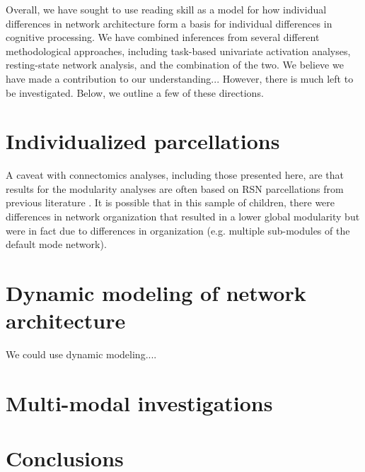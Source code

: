 Overall, we have sought to use reading skill as a model for how individual differences in network architecture form a basis for individual differences in cognitive processing. We have combined inferences from several different methodological approaches, including task-based univariate activation analyses, resting-state network analysis, and the combination of the two. We believe we have made a contribution to our understanding... However, there is much left to be investigated. Below, we outline a few of these directions.

\section{Individualized parcellations}

A caveat with connectomics analyses, including those presented here, are that results for the modularity analyses are often based on RSN parcellations from previous literature \citep{Power2011}. It is possible that in this sample of children, there were differences in network organization that resulted in a lower global modularity but were in fact due to differences in organization (e.g. multiple sub-modules of the default mode network). 


\section{Dynamic modeling of network architecture}

We could use dynamic modeling....




\section{Multi-modal investigations}



\section{Conclusions}


